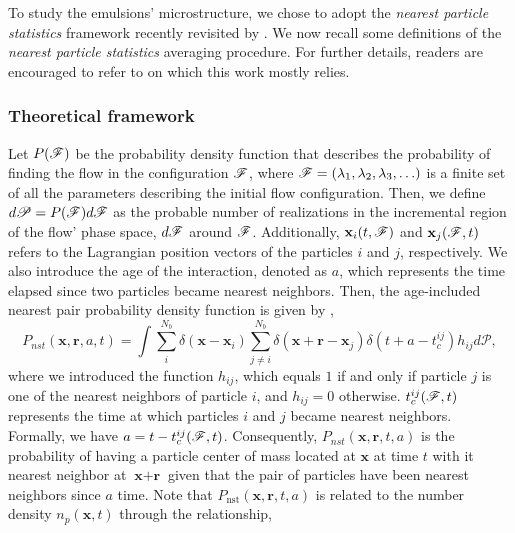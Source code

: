 
To study the emulsions' microstructure, we chose to adopt the \textit{nearest particle statistics} framework recently revisited by \citet{zhang2021ensemble}.
We now recall some definitions of the \textit{nearest particle statistics} averaging procedure. 
For further details, readers are encouraged to refer to \citet{zhang2023evolution} on which this work mostly relies.

\subsubsection*{Theoretical framework}
Let $P(\mathscr{F})$ be the probability density function that describes the probability of finding the flow in the configuration $\mathscr{F}$, where $\mathscr{F} = (\lambda_1,\lambda_2,\lambda_3,\ldots)$ is a finite set of all the parameters describing the initial flow configuration.
Then, we define $d\mathscr{P} = P(\mathscr{F})d\mathscr{F}$ as the probable number of realizations in the incremental region of the flow' phase space, $d\mathscr{F}$ around $\mathscr{F}$.
Additionally,  $\textbf{x}_i(t,\mathscr{F})$ and $\textbf{x}_j(\mathscr{F},t)$ refers to the Lagrangian position vectors of the particles $i$ and $j$, respectively. 
We also introduce the age of the interaction, denoted as $a$, which represents the time elapsed since two particles became nearest neighbors.
Then, the age-included nearest pair probability density function is given by \citep{zhang2021ensemble,zhang2023evolution},
\begin{equation}
    P_{nst}(\textbf{x},\textbf{r},a,t)= 
    \int \sum_{i}^{N_b}\delta(\textbf{x}-\textbf{x}_i)
    \sum_{j\neq i}^{N_b}\delta(\textbf{x}+\textbf{r}-\textbf{x}_j) 
    \delta(t+a-t_c^{ij}) 
    h_{ij} d\mathscr{P},
    \label{eq:P_nstij}
\end{equation}
where we introduced the function $h_{ij}$, which equals $1$ if and only if particle $j$ is one of the nearest neighbors of particle $i$, and $h_{ij} = 0$ otherwise. 
$t_c^{ij}(\mathscr{F},t)$ represents the time at which particles $i$ and $j$ became nearest neighbors. 
Formally, we have $a = t - t^{ij}_c(\mathscr{F},t)$.
Consequently, $P_{nst}(\textbf{x},\textbf{r},t,a)$ is the probability of having a particle center of mass located at $\textbf{x}$ at time $t$ with it nearest neighbor at $\textbf{x}+\textbf{r}$ given that the pair of particles have been nearest neighbors since $a$ time.
Note that $P_\text{nst}(\textbf{x},\textbf{r},t,a)$ is related to the number density $n_p(\textbf{x},t)$ through the relationship, 
